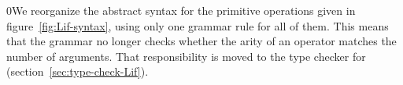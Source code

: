 \documentclass[7x10]{TimesAPriori_MIT}%
\def\racketEd{0}
\def\edition{1}
\newcommand{\racket}[1]{{\if\edition\racketEd{#1}\fi}}
\numberwithin{theorem}{chapter}
\numberwithin{definition}{chapter}
\numberwithin{equation}{chapter}
\begin{document}
\racket{We reorganize the abstract syntax for the primitive
  operations given in figure~\ref{fig:Lif-syntax}, using only one grammar
  rule for all of them. This means that the grammar no longer checks
  whether the arity of an operator matches the number of
  arguments. That responsibility is moved to the type checker for
  \LangIf{} (section~\ref{sec:type-check-Lif}).}


\newcommand{\LifGrammarRacket}{
  \begin{array}{lcl}
   \Type &::=& \key{Boolean} \\
    \itm{bool} &::=& \TRUE \MID \FALSE \\  
    \itm{cmp} &::= & \key{eq?} \MID \key{<} \MID \key{<=} \MID \key{>} \MID \key{>=} \\
    \Exp &::=& \itm{bool}
        \MID (\key{and}\;\Exp\;\Exp) \MID (\key{or}\;\Exp\;\Exp)
        \MID (\key{not}\;\Exp) \\
        &\MID& (\itm{cmp}\;\Exp\;\Exp) \MID \CIF{\Exp}{\Exp}{\Exp} 
  \end{array}
}
\newcommand{\LifASTRacket}{
\begin{array}{lcl}
   \Type &::=& \key{Boolean} \\
  \itm{bool} &::=& \code{\#t} \MID \code{\#f} \\
  \itm{cmp} &::= & \code{eq?} \MID \code{<} \MID \code{<=} \MID \code{>} \MID \code{>=} \\
  \itm{op} &::= & \itm{cmp} \MID \code{and} \MID \code{or} \MID \code{not} \\
  \Exp &::=& \BOOL{\itm{bool}} \MID \IF{\Exp}{\Exp}{\Exp} 
\end{array}
}
\newcommand{\LintOpAST}{
  \begin{array}{rcl}
    \Type &::=& \key{Integer} \\
    \itm{op} &::= & \code{read} \MID \code{+} \MID \code{-}\\
    \Exp{} &::=& \INT{\Int} \MID \PRIM{\itm{op}}{\Exp\ldots}    
  \end{array}
}
\end{document}
